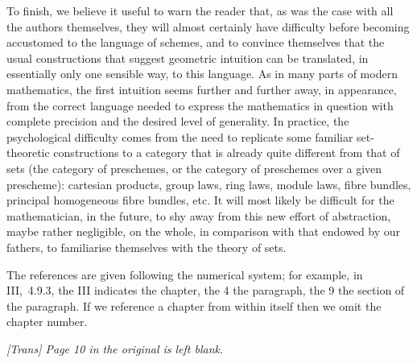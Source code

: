 \sectionbreak

To finish, we believe it useful to warn the reader that, as was the case with
all the authors themselves, they will almost certainly have difficulty before
becoming accustomed to the language of schemes, and to convince themselves that
the usual constructions that suggest geometric intuition can be translated, in
essentially only one sensible way, to this language. As in many parts of modern
mathematics, the first intuition seems further and further away, in appearance,
from the correct language needed to express the mathematics in question with
complete precision and the desired level of generality. In practice, the
psychological difficulty comes from the need to replicate some familiar
set-theoretic constructions to a category that is already quite different from
that of sets (the category of preschemes, or the category of preschemes over a
given prescheme): cartesian products, group laws, ring laws, module laws, fibre
bundles, principal homogeneous fibre bundles, etc. It will most likely
be difficult for the mathematician, in the future, to shy away from this new
effort of abstraction, maybe rather negligible, on the whole, in comparison with
that endowed by our fathers, to familiarise themselves with the theory of sets.

\sectionbreak

The references are given following the numerical system; for example, in
III,~4.9.3, the III indicates the chapter, the 4 the paragraph, the 9 the
section of the paragraph. If we reference a chapter from within itself then we
omit the chapter number.

\bigskip

{\it [Trans] Page 10 in the original is left blank.}







